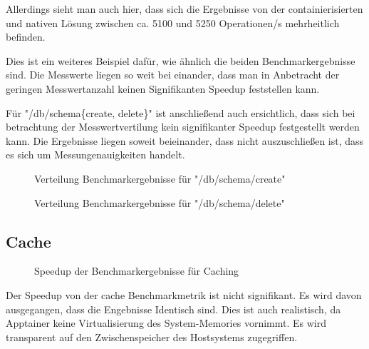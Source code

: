 Allerdings sieht man auch hier, dass sich die Ergebnisse von der containierisierten und nativen Lösung zwischen ca. 5100 und 5250 Operationen/s mehrheitlich befinden. 

Dies ist ein weiteres Beispiel dafür, wie ähnlich die beiden Benchmarkergebnisse sind. Die Messwerte liegen so weit bei einander, dass man in Anbetracht der geringen Messwertanzahl keinen Signifikanten Speedup feststellen kann.


Für "/db/schema\{create, delete\}" ist anschließend auch ersichtlich, dass sich bei betrachtung der Messwertvertilung kein signifikanter Speedup festgestellt werden kann. Die Ergebnisse liegen soweit beieinander, dass nicht auszuschließen ist, dass es sich um Messungenauigkeiten handelt.

\begin{figure}
    \centering
    
    \caption{Verteilung Benchmarkergebnisse für "/db/schema/create"}
    \label{fig:mdist_db_schema_create}
\end{figure}

\begin{figure}
    \centering
    
    \caption{Verteilung Benchmarkergebnisse für "/db/schema/delete"}
    \label{fig:mdist_db_schema_delete}
\end{figure}

\FloatBarrier

\subsection{Cache}


\begin{figure}
    \centering
    
    \caption{Speedup der Benchmarkergebnisse für Caching}
    \label{fig:speedup_cache}
\end{figure}

\FloatBarrier

Der Speedup von der cache Benchmarkmetrik ist nicht signifikant. Es wird davon ausgegangen, dass die Engebnisse Identisch sind. Dies ist auch realistisch, da Apptainer keine Virtualisierung des System-Memories vornimmt. Es wird transparent auf den Zwischenspeicher des Hostsystems zugegriffen.


